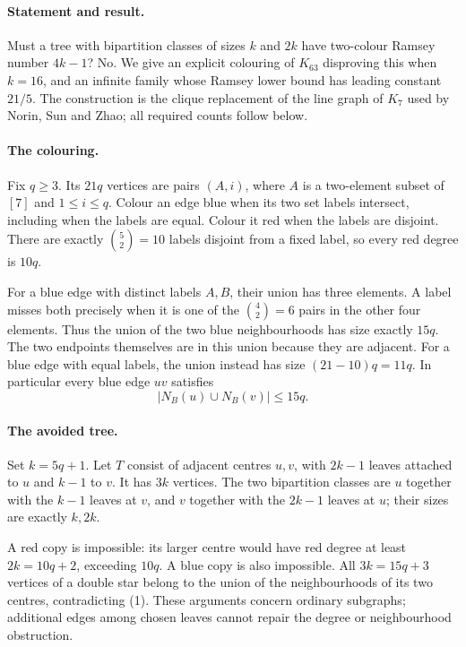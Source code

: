 \paragraph{Statement and result.}
Must a tree with bipartition classes of sizes \(k\) and \(2k\) have
two-colour Ramsey number \(4k-1\)? No. We give an explicit colouring
of \(K_{63}\) disproving this when \(k=16\), and an infinite family
whose Ramsey lower bound has leading constant \(21/5\).
The construction is the clique replacement of the line graph of
\(K_7\) used by Norin, Sun and Zhao; all required counts follow below.

\paragraph{The colouring.}
Fix \(q\geq3\). Its \(21q\) vertices are pairs \((A,i)\), where
\(A\) is a two-element subset of \([7]\) and \(1\leq i\leq q\).
Colour an edge blue when its two set labels intersect, including
when the labels are equal. Colour it red when the labels are disjoint.
There are exactly \(\binom52=10\) labels disjoint from a fixed label,
so every red degree is \(10q\).

For a blue edge with distinct labels \(A,B\), their union has three
elements. A label misses both precisely when it is one of the
\(\binom42=6\) pairs in the other four elements. Thus the union of
the two blue neighbourhoods has size exactly \(15q\).
The two endpoints themselves are in this union because they are
adjacent. For a blue edge with equal labels, the union instead has
size \((21-10)q=11q\). In particular every blue edge \(uv\) satisfies
\[
 |N_B(u)\cup N_B(v)|\leq15q. \tag{1}
\]

\paragraph{The avoided tree.}
Set \(k=5q+1\). Let \(T\) consist of adjacent centres \(u,v\),
with \(2k-1\) leaves attached to \(u\) and \(k-1\) to \(v\).
It has \(3k\) vertices. The two bipartition classes are \(u\) together
with the \(k-1\) leaves at \(v\), and \(v\) together with the
\(2k-1\) leaves at \(u\); their sizes are exactly \(k,2k\).

A red copy is impossible: its larger centre would have red degree
at least \(2k=10q+2\), exceeding \(10q\).
A blue copy is also impossible. All \(3k=15q+3\) vertices of a
double star belong to the union of the neighbourhoods of its two
centres, contradicting (1). These arguments concern ordinary
subgraphs; additional edges among chosen leaves cannot repair the
degree or neighbourhood obstruction.

